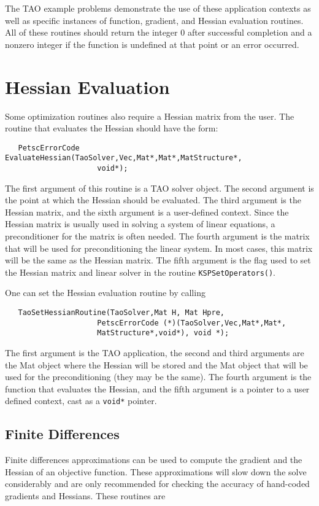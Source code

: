 The TAO example problems demonstrate the use of these application contexts
as well as specific instances of function, gradient, and Hessian 
evaluation routines.
All of these routines should return the integer $0$ after 
successful completion and a nonzero integer if the function
is undefined at that point or an error occurred.

\section{Hessian Evaluation}
\label{sec:matrixfree}
\label{sec:finitedifference}

Some optimization routines also require a Hessian matrix from the user.
The routine that evaluates the Hessian should have the form:
\begin{verbatim}
   PetscErrorCode EvaluateHessian(TaoSolver,Vec,Mat*,Mat*,MatStructure*,
                     void*);
\end{verbatim}
\noindent
The first argument of this routine is a TAO solver object.  The second
argument is the point at which the Hessian should be evaluated.  The
third argument is the Hessian matrix, and the sixth argument is a
user-defined context.
Since the Hessian matrix is usually used in solving
a system of linear equations, a preconditioner for the matrix is often
needed.  The fourth argument is the matrix that will be used
for preconditioning the linear system.  In most cases, this
matrix will be the same as the Hessian matrix.  The fifth
argument is the flag used to set the Hessian matrix and
linear solver in the routine {\tt KSPSetOperators()}.

One can set the Hessian evaluation routine by calling 
\begin{verbatim}
   TaoSetHessianRoutine(TaoSolver,Mat H, Mat Hpre,
                     PetscErrorCode (*)(TaoSolver,Vec,Mat*,Mat*,
                     MatStructure*,void*), void *);
\end{verbatim}
\noindent
The first argument is the TAO application, the second and third arguments
are the Mat object where the Hessian will be stored and the Mat object
that will be used for the preconditioning (they may be the same). The fourth 
argument is the function that evaluates the Hessian, 
and the fifth argument is a pointer to a user defined context,
cast as a {\tt void*} pointer.

\subsection{Finite Differences} 
Finite differences approximations can be used to compute the gradient and the
Hessian of an objective
function.  These approximations will slow down the solve considerably and are only 
recommended for checking the accuracy of hand-coded gradients and Hessians.
These routines are 

